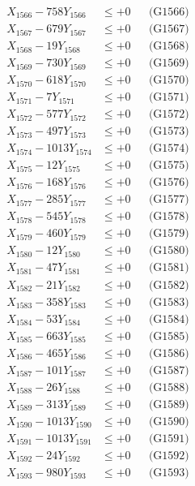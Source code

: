 \documentclass[a4paper,10pt]{article}
\begin{document}
{\begin{align}
X_{1566} - 758Y_{1566} &\leq +0 && \text{(G1566)} \\
X_{1567} - 679Y_{1567} &\leq +0 && \text{(G1567)} \\
X_{1568} - 19Y_{1568} &\leq +0 && \text{(G1568)} \\
X_{1569} - 730Y_{1569} &\leq +0 && \text{(G1569)} \\
X_{1570} - 618Y_{1570} &\leq +0 && \text{(G1570)} \\
\allowbreak
X_{1571} - 7Y_{1571} &\leq +0 && \text{(G1571)} \\
X_{1572} - 577Y_{1572} &\leq +0 && \text{(G1572)} \\
X_{1573} - 497Y_{1573} &\leq +0 && \text{(G1573)} \\
X_{1574} - 1013Y_{1574} &\leq +0 && \text{(G1574)} \\
X_{1575} - 12Y_{1575} &\leq +0 && \text{(G1575)} \\
X_{1576} - 168Y_{1576} &\leq +0 && \text{(G1576)} \\
X_{1577} - 285Y_{1577} &\leq +0 && \text{(G1577)} \\
X_{1578} - 545Y_{1578} &\leq +0 && \text{(G1578)} \\
X_{1579} - 460Y_{1579} &\leq +0 && \text{(G1579)} \\
X_{1580} - 12Y_{1580} &\leq +0 && \text{(G1580)} \\
\allowbreak
X_{1581} - 47Y_{1581} &\leq +0 && \text{(G1581)} \\
X_{1582} - 21Y_{1582} &\leq +0 && \text{(G1582)} \\
X_{1583} - 358Y_{1583} &\leq +0 && \text{(G1583)} \\
X_{1584} - 53Y_{1584} &\leq +0 && \text{(G1584)} \\
X_{1585} - 663Y_{1585} &\leq +0 && \text{(G1585)} \\
X_{1586} - 465Y_{1586} &\leq +0 && \text{(G1586)} \\
X_{1587} - 101Y_{1587} &\leq +0 && \text{(G1587)} \\
X_{1588} - 26Y_{1588} &\leq +0 && \text{(G1588)} \\
X_{1589} - 313Y_{1589} &\leq +0 && \text{(G1589)} \\
X_{1590} - 1013Y_{1590} &\leq +0 && \text{(G1590)} \\
\allowbreak
X_{1591} - 1013Y_{1591} &\leq +0 && \text{(G1591)} \\
X_{1592} - 24Y_{1592} &\leq +0 && \text{(G1592)} \\
X_{1593} - 980Y_{1593} &\leq +0 && \text{(G1593)} \\

\end{align}}
\end{document}
